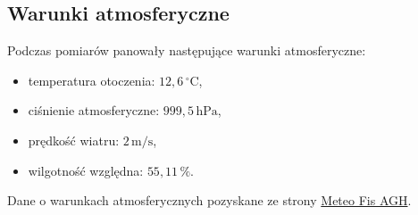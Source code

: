 \subsection{Warunki atmosferyczne}
\label{sec:warunki-atmosferyczne}
Podczas pomiarów panowały następujące warunki atmosferyczne:
\begin{itemize}
 \item temperatura otoczenia: $12{,}6\,^{\circ}\mathrm{C}$,
 \item ciśnienie atmosferyczne: $999{,}5\,\mathrm{hPa}$,
 \item prędkość wiatru: $2\,\mathrm{m/s}$,
 \item wilgotność względna: $55{,}11\,\%$.
\end{itemize}
Dane o warunkach atmosferycznych pozyskane ze strony \href{https://meteo.fis.agh.edu.pl.}{ Meteo Fis AGH}.